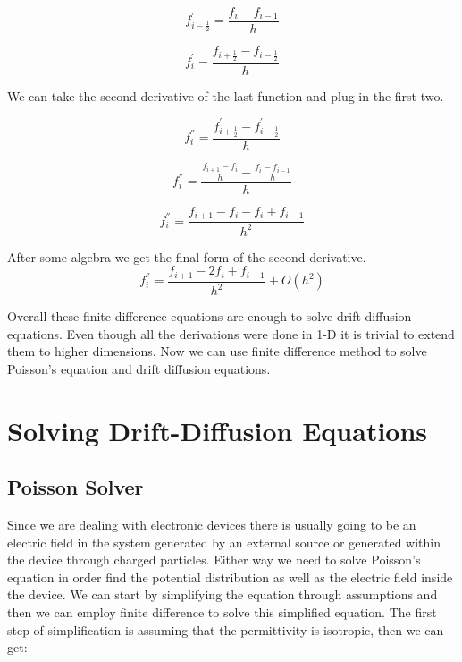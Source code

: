 \begin{equation}
f_{i-\frac{1}{2}}^{'}=\frac{f_{i}-f_{i-1}}{h}
\end{equation}

\begin{equation}
f^{'}_{i}=\frac{f_{i+\frac{1}{2}}-f_{i-\frac{1}{2}}}{h}
\end{equation}

We can take the second derivative of the last function and plug in the first two.

\begin{equation}\nonumber
f^{''}_{i}=\frac{f_{i+\frac{1}{2}}^{'}-f_{i-\frac{1}{2}}^{'}}{h}
\end{equation}

\begin{equation}\nonumber
f^{''}_{i}=\frac{\frac{f_{i+1}-f_{i}}{h}-\frac{f_{i}-f_{i-1}}{h}}{h}
\end{equation}

\begin{equation}\nonumber
f^{''}_{i}=\frac{f_{i+1}-f_{i}-f_{i}+f_{i-1}}{h^2}
\end{equation}

After some algebra we get the final form of the second derivative.
\begin{equation}
f^{''}_{i}=\frac{f_{i+1}-2f_{i}+f_{i-1}}{h^2}+O(h^2)
\label{fdc2}
\end{equation}

Overall these finite difference equations are enough to solve drift diffusion equations. Even though all the derivations were done in 1-D it is trivial to extend them to higher dimensions. Now we can use finite difference method to solve Poisson's equation and drift diffusion equations.

\clearpage
\section{Solving Drift-Diffusion Equations}
\subsection{Poisson Solver}

Since we are dealing with electronic devices there is usually going to be an electric field in the system generated by an external source or generated within the device through charged particles. Either way we need to solve Poisson's equation in order find the potential distribution as well as the electric field inside the device. We can start by simplifying the equation through assumptions and then we can employ finite difference to solve this simplified equation. The first step of simplification is assuming that the permittivity is isotropic, then we can get: 
 
